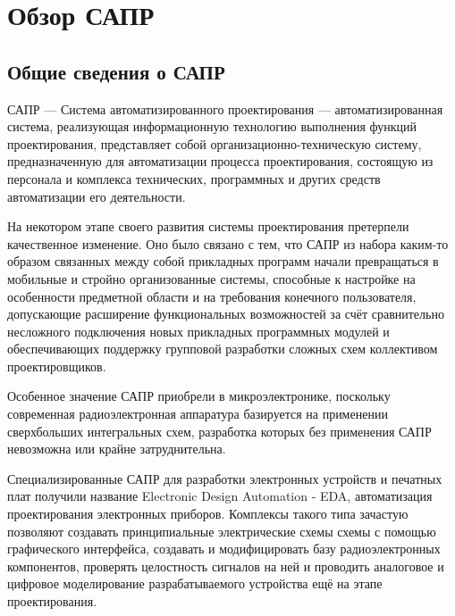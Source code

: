 \section{Обзор САПР}
\subsection{Общие сведения о САПР}
\begin{par}
САПР --- Система автоматизированного проектирования --- автоматизированная система, реализующая
информационную технологию выполнения функций проектирования, представляет собой
организационно-техническую систему, предназначенную для автоматизации процесса проектирования,
состоящую из персонала и комплекса технических, программных и других средств
автоматизации его деятельности.
\end{par}

\begin{par}
На некотором этапе своего развития системы проектирования претерпели качественное изменение.
Оно было связано с тем, что САПР из набора каким-то образом связанных между собой прикладных программ начали превращаться в мобильные и стройно организованные системы, способные к настройке на особенности предметной области и на требования конечного пользователя, допускающие расширение функциональных возможностей за счёт сравнительно несложного подключения новых прикладных программных модулей и обеспечивающих поддержку групповой разработки сложных схем коллективом проектировщиков.
\end{par}

\begin{par}
Особенное значение САПР приобрели в микроэлектронике, поскольку современная радиоэлектронная аппаратура базируется на применении сверхбольших интегральных схем, разработка которых без применения САПР невозможна или крайне затруднительна.
\end{par}

\begin{par}
Специализированные САПР для разработки электронных устройств и печатных плат получили название Electronic Design Automation - EDA, автоматизация проектирования электронных приборов. Комплексы такого типа зачастую позволяют создавать принципиальные электрические схемы схемы с помощью графического интерфейса, создавать и модифицировать  базу радиоэлектронных компонентов, проверять целостность сигналов на ней и проводить аналоговое и цифровое моделирование разрабатываемого устройства ещё на этапе проектирования.
\end{par}

